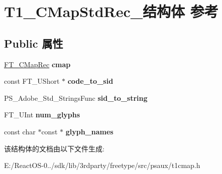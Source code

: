 \hypertarget{struct_t1___c_map_std_rec__}{}\section{T1\+\_\+\+C\+Map\+Std\+Rec\+\_\+结构体 参考}
\label{struct_t1___c_map_std_rec__}
\subsection*{Public 属性}
\begin{DoxyCompactItemize}
\item 
\mbox{\label{struct_t1___c_map_std_rec___a482349330d91488ef43824134cd69ab5}} 
\hyperlink{struct_f_t___c_map_rec__}{F\+T\+\_\+\+C\+Map\+Rec} {\bfseries cmap}
\item 
\mbox{\label{struct_t1___c_map_std_rec___a7ade6df788a54dfc449f3152bab78016}} 
const F\+T\+\_\+\+U\+Short $\ast$ {\bfseries code\+\_\+to\+\_\+sid}
\item 
\mbox{\label{struct_t1___c_map_std_rec___a41657430581f24f413fcb086e4d46ac7}} 
P\+S\+\_\+\+Adobe\+\_\+\+Std\+\_\+\+Strings\+Func {\bfseries sid\+\_\+to\+\_\+string}
\item 
\mbox{\label{struct_t1___c_map_std_rec___a8021567362767fae9912524311293af4}} 
F\+T\+\_\+\+U\+Int {\bfseries num\+\_\+glyphs}
\item 
\mbox{\label{struct_t1___c_map_std_rec___a0924165bae0e31240459d63126567ce5}} 
const char $\ast$const  $\ast$ {\bfseries glyph\+\_\+names}
\end{DoxyCompactItemize}


该结构体的文档由以下文件生成\+:\begin{DoxyCompactItemize}
\item 
E\+:/\+React\+O\+S-\/0../sdk/lib/3rdparty/freetype/src/psaux/t1cmap.\+h\end{DoxyCompactItemize}
